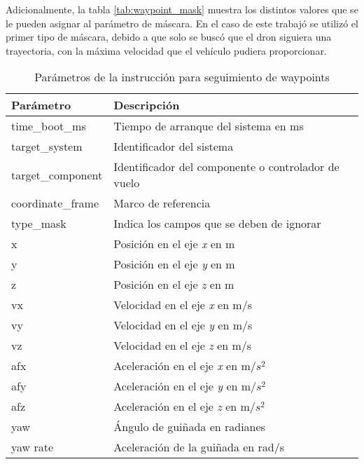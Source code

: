 Adicionalmente, la tabla \ref{tab:waypoint_mask} muestra los distintos valores que se le pueden asignar al parámetro de máscara. En el caso de este trabajó se utilizó el primer tipo de máscara, debido a que solo se buscó que el dron siguiera una trayectoria, con la máxima velocidad que el vehículo pudiera proporcionar.

\begin{table}[ht]
    \centering
    \begin{tabular}{||l|l||}
        \hline
        Parámetro & Descripción\\
        \hline
        time\_boot\_ms & Tiempo de arranque del sistema en ms\\
        target\_system & Identificador del sistema\\
        target\_component & Identificador del componente o controlador de vuelo\\
        coordinate\_frame & Marco de referencia\\
        type\_mask & Indica los campos que se deben de ignorar\\
        x & Posición en el eje \textit{x} en m\\
        y & Posición en el eje \textit{y} en m\\
        z & Posición en el eje \textit{z} en m\\
        vx & Velocidad en el eje \textit{x} en m/s\\
        vy & Velocidad en el eje \textit{y} en m/s\\
        vz & Velocidad en el eje \textit{z} en m/s\\
        afx & Aceleración en el eje \textit{x} en m/$s^2$\\
        afy & Aceleración en el eje \textit{y} en m/$s^2$\\
        afz & Aceleración en el eje \textit{z} en m/$s^2$\\
        yaw & Ángulo de guiñada en radianes\\
        yaw rate & Aceleración de la guiñada en rad/s\\
        \hline
    \end{tabular}
    \caption{Parámetros de la instrucción para seguimiento de waypoints}
    \label{tab:waypoint}
\end{table}


